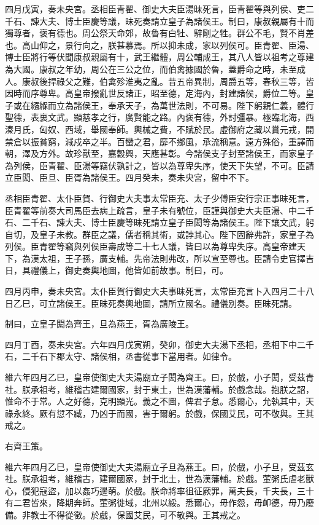 四月戊寅，奏未央宮。丞相臣青翟、御史大夫臣湯昧死言，臣青翟等與列侯、吏二千石、諫大夫、博士臣慶等議，昧死奏請立皇子為諸侯王。制曰，康叔親屬有十而獨尊者，褒有德也。周公祭天命郊，故魯有白牡、騂剛之牲。群公不毛，賢不肖差也。高山仰之，景行向之，朕甚慕焉。所以抑未成，家以列侯可。臣青翟、臣湯、博士臣將行等伏聞康叔親屬有十，武王繼體，周公輔成王，其八人皆以祖考之尊建為大國。康叔之年幼，周公在三公之位，而伯禽據國於魯，蓋爵命之時，未至成人。康叔後捍祿父之難，伯禽殄淮夷之亂。昔五帝異制，周爵五等，春秋三等，皆因時而序尊卑。高皇帝撥亂世反諸正，昭至德，定海內，封建諸侯，爵位二等。皇子或在繦緥而立為諸侯王，奉承天子，為萬世法則，不可易。陛下躬親仁義，體行聖德，表裏文武。顯慈孝之行，廣賢能之路。內褒有德，外討彊暴。極臨北海，西溱月氏，匈奴、西域，舉國奉師。輿械之費，不賦於民。虛御府之藏以賞元戎，開禁倉以振貧窮，減戍卒之半。百蠻之君，靡不鄉風，承流稱意。遠方殊俗，重譯而朝，澤及方外。故珍獸至，嘉穀興，天應甚彰。今諸侯支子封至諸侯王，而家皇子為列侯，臣青翟、臣湯等竊伏孰計之，皆以為尊卑失序，使天下失望，不可。臣請立臣閎、臣旦、臣胥為諸侯王。四月癸未，奏未央宮，留中不下。

丞相臣青翟、太仆臣賀、行御史大夫事太常臣充、太子少傅臣安行宗正事昧死言，臣青翟等前奏大司馬臣去病上疏言，皇子未有號位，臣謹與御史大夫臣湯、中二千石、二千石、諫大夫、博士臣慶等昧死請立皇子臣閎等為諸侯王。陛下讓文武，躬自切，及皇子未教。群臣之議，儒者稱其術，或誖其心。陛下固辭弗許，家皇子為列侯。臣青翟等竊與列侯臣壽成等二十七人議，皆曰以為尊卑失序。高皇帝建天下，為漢太祖，王子孫，廣支輔。先帝法則弗改，所以宣至尊也。臣請令史官擇吉日，具禮儀上，御史奏輿地圖，他皆如前故事。制曰，可。

四月丙申，奏未央宮。太仆臣賀行御史大夫事昧死言，太常臣充言卜入四月二十八日乙巳，可立諸侯王。臣昧死奏輿地圖，請所立國名。禮儀別奏。臣昧死請。

制曰，立皇子閎為齊王，旦為燕王，胥為廣陵王。

四月丁酉，奏未央宮。六年四月戊寅朔，癸卯，御史大夫湯下丞相，丞相下中二千石，二千石下郡太守、諸侯相，丞書從事下當用者。如律令。

維六年四月乙巳，皇帝使御史大夫湯廟立子閎為齊王。曰，於戲，小子閎，受茲青社。朕承祖考，維稽古建爾國家，封于東土，世為漢藩輔。於戲念哉。抱朕之詔，惟命不于常。人之好德，克明顯光。義之不圖，俾君子怠。悉爾心，允執其中，天祿永終。厥有愆不臧，乃凶于而國，害于爾躬。於戲，保國艾民，可不敬與。王其戒之。

右齊王策。

維六年四月乙巳，皇帝使御史大夫湯廟立子旦為燕王。曰，於戲，小子旦，受茲玄社。朕承祖考，維稽古，建爾國家，封于北土，世為漢藩輔。於戲。葷粥氏虐老獸心，侵犯寇盜，加以姦巧邊萌。於戲。朕命將率徂征厥罪，萬夫長，千夫長，三十有二君皆來，降期奔師。葷粥徙域，北州以綏。悉爾心，毋作怨，毋卹德，毋乃廢備。非教士不得從徵。於戲，保國艾民，可不敬與。王其戒之。

